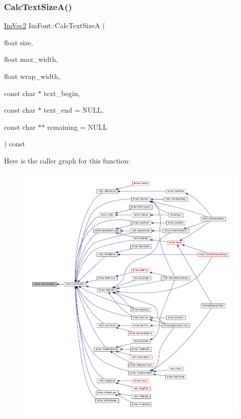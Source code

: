 \mbox{\label{struct_im_font_ad67f64fd206ad197f4b93b1a1ae27cfe}} 
\subsubsection{\texorpdfstring{Calc\+Text\+Size\+A()}{CalcTextSizeA()}}
{\footnotesize\ttfamily \mbox{\hyperlink{struct_im_vec2}{Im\+Vec2}} Im\+Font\+::\+Calc\+Text\+SizeA (\begin{DoxyParamCaption}\item[{float}]{size,  }\item[{float}]{max\+\_\+width,  }\item[{float}]{wrap\+\_\+width,  }\item[{const char $\ast$}]{text\+\_\+begin,  }\item[{const char $\ast$}]{text\+\_\+end = {\ttfamily NULL},  }\item[{const char $\ast$$\ast$}]{remaining = {\ttfamily NULL} }\end{DoxyParamCaption}) const}

Here is the caller graph for this function\+:
\nopagebreak
\begin{figure}[H]
\begin{center}
\leavevmode
\includegraphics[width=350pt]{struct_im_font_ad67f64fd206ad197f4b93b1a1ae27cfe_icgraph}
\end{center}
\end{figure}
\mbox{\label{struct_im_font_a3781bb82a1ceba919cb6c98a398c7a67}} 
